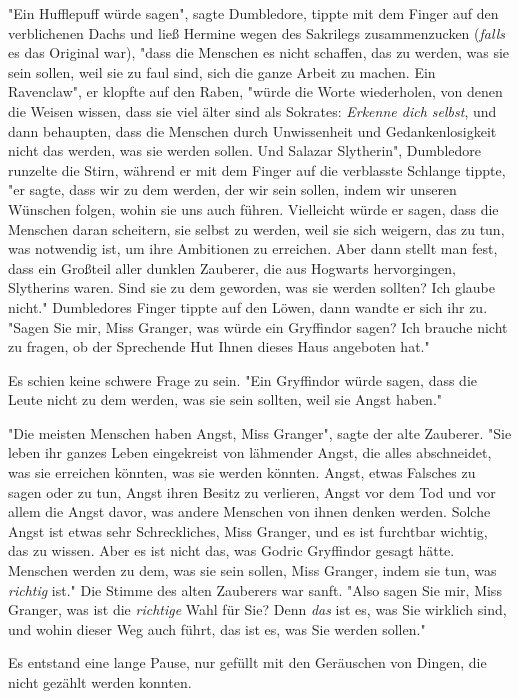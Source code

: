 {"Ein Hufflepuff würde sagen", sagte Dumbledore, tippte mit dem Finger auf den verblichenen Dachs und ließ Hermine wegen des Sakrilegs zusammenzucken (\emph{falls} es das Original war), "dass die Menschen es nicht schaffen, das zu werden, was sie sein sollen, weil sie zu faul sind, sich die ganze Arbeit zu machen. Ein Ravenclaw", er klopfte auf den Raben, "würde die Worte wiederholen, von denen die Weisen wissen, dass sie viel älter sind als Sokrates: \emph{Erkenne dich selbst}, und dann behaupten, dass die Menschen durch Unwissenheit und Gedankenlosigkeit nicht das werden, was sie werden sollen. Und Salazar Slytherin", Dumbledore runzelte die Stirn, während er mit dem Finger auf die verblasste Schlange tippte, "er sagte, dass wir zu dem werden, der wir sein sollen, indem wir unseren Wünschen folgen, wohin sie uns auch führen. Vielleicht würde er sagen, dass die Menschen daran scheitern, sie selbst zu werden, weil sie sich weigern, das zu tun, was notwendig ist, um ihre Ambitionen zu erreichen. Aber dann stellt man fest, dass ein Großteil aller dunklen Zauberer, die aus Hogwarts hervorgingen, Slytherins waren. Sind sie zu dem geworden, was sie werden sollten? Ich glaube nicht." Dumbledores Finger tippte auf den Löwen, dann wandte er sich ihr zu. "Sagen Sie mir, Miss Granger, was würde ein Gryffindor sagen? Ich brauche nicht zu fragen, ob der Sprechende Hut Ihnen dieses Haus angeboten hat."

Es schien keine schwere Frage zu sein. "Ein Gryffindor würde sagen, dass die Leute nicht zu dem werden, was sie sein sollten, weil sie Angst haben."

"Die meisten Menschen haben Angst, Miss Granger", sagte der alte Zauberer. "Sie leben ihr ganzes Leben eingekreist von lähmender Angst, die alles abschneidet, was sie erreichen könnten, was sie werden könnten. Angst, etwas Falsches zu sagen oder zu tun, Angst ihren Besitz zu verlieren, Angst vor dem Tod und vor allem die Angst davor, was andere Menschen von ihnen denken werden. Solche Angst ist etwas sehr Schreckliches, Miss Granger, und es ist furchtbar wichtig, das zu wissen. Aber es ist nicht das, was Godric Gryffindor gesagt hätte. Menschen werden zu dem, was sie sein sollen, Miss Granger, indem sie tun, was \emph{richtig} ist." Die Stimme des alten Zauberers war sanft. "Also sagen Sie mir, Miss Granger, was ist die \emph{richtige} Wahl für Sie? Denn \emph{das} ist es, was Sie wirklich sind, und wohin dieser Weg auch führt, das ist es, was Sie werden sollen."

Es entstand eine lange Pause, nur gefüllt mit den Geräuschen von Dingen, die nicht gezählt werden konnten.

}
